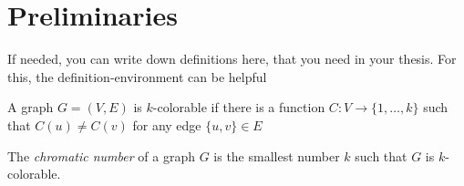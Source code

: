 \chapter{Preliminaries}
If needed, you can write down definitions here, that you need in your thesis.
For this, the definition-environment can be helpful
\begin{definition}
	A graph $G=(V,E)$ is $k$-colorable if there is a function $C: V\rightarrow \{1,\dots, k\}$ such that $C(u)\neq C(v)$ for any edge $\{u,v\}\in E$
	
	The \emph{chromatic number} of a graph $G$ is the smallest number $k$ such that $G$ is $k$-colorable.
\end{definition}
